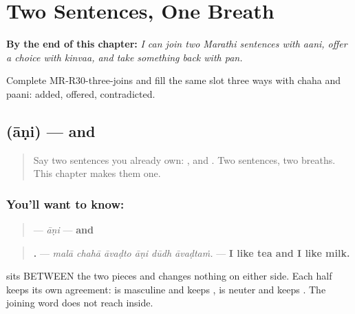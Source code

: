 
\chapter{Two Sentences, One Breath}
\label{ch:mr-flat-joins}

\begin{chapteropening}
\textbf{By the end of this chapter:} \emph{I can join two Marathi sentences with aani, offer a choice with kinvaa, and take something back with pan.}

Complete MR-R30-three-joins and fill the same slot three ways with chaha and paani: added, offered, contradicted.
\end{chapteropening}

\section[\texorpdfstring{\mr{आणि} (āṇi)}{आणि (āṇi)}]{ (āṇi) — and}

\label{lesson:MR-C30-aani}



\begin{quote}
Say two sentences you already own: \textbf{  }, and \textbf{  }. Two sentences, two breaths. This chapter makes them one.
\end{quote}

\subsection*{You'll want to know: }
\begin{quote}
\textbf{} — \emph{āṇi} — \textbf{and}
\end{quote}

\begin{quote}
\textbf{     .} — \emph{malā chahā āvaḍto āṇi dūdh āvaḍtaṁ.} — \textbf{I like tea and I like milk.}
\end{quote}

\textbf{} sits BETWEEN the two pieces and changes nothing on either side. Each half keeps its own agreement: \textbf{} is masculine and keeps \textbf{}, \textbf{} is neuter and keeps \textbf{}. The joining word does not reach inside.

